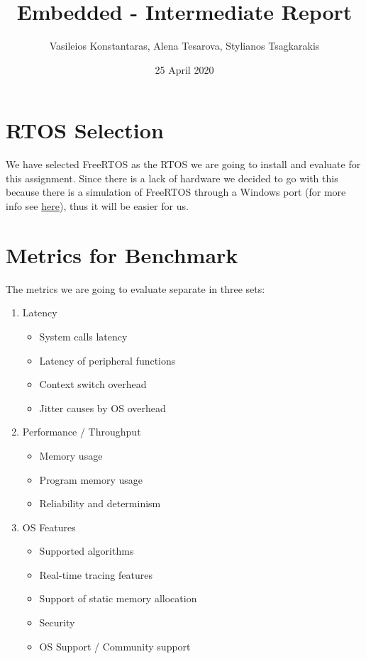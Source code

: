 \documentclass{article}
\title{Embedded - Intermediate Report}
\author{Vasileios Konstantaras, Alena Tesarova, Stylianos Tsagkarakis}
\date{25 April 2020}
\begin{document}
\maketitle

\section{RTOS Selection}
We have selected FreeRTOS as the RTOS we are going to install and evaluate for this assignment. Since there is a lack of hardware we decided to go with this because there is a simulation of FreeRTOS through a Windows port (for more info see \href{https://freertos.org/FreeRTOS-Windows-Simulator-Emulator-for-Visual-Studio-and-Eclipse-MingW.html}{here}), thus it will be easier for us. 

\section{Metrics for Benchmark}
The metrics we are going to evaluate separate in three sets: 

\begin{enumerate}

    \item Latency
        \begin{itemize}
            \item System calls latency
            \item Latency of peripheral functions
            \item Context switch overhead
            \item Jitter causes by OS overhead
        \end{itemize}

    \item Performance / Throughput
        \begin{itemize}
            \item Memory usage
            \item Program memory usage
            \item Reliability and determinism
        \end{itemize}

    \item OS Features
        \begin{itemize}
            \item Supported algorithms
            \item Real-time tracing features
            \item Support of static memory allocation
            \item Security
            \item OS Support / Community support
        \end{itemize}

\end{enumerate}
\end{document}
